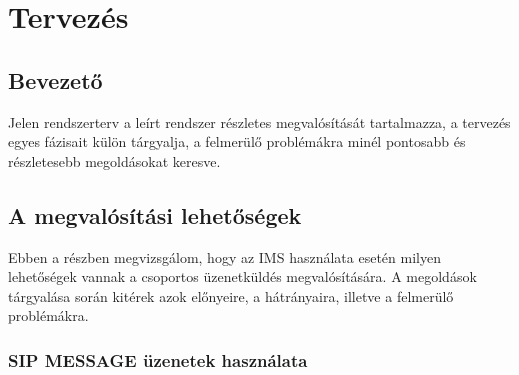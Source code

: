 

\section{Tervezés}

\subsection{Bevezető}

Jelen rendszerterv a leírt rendszer részletes megvalósítását
tartalmazza, a tervezés egyes fázisait külön tárgyalja, a felmerülő
problémákra minél pontosabb és részletesebb megoldásokat keresve.

\subsection{A megvalósítási lehetőségek}

Ebben a részben megvizsgálom, hogy az IMS használata esetén milyen lehetőségek vannak a csoportos üzenetküldés megvalósítására. A megoldások tárgyalása során kitérek azok előnyeire, a hátrányaira, illetve a felmerülő problémákra.

\subsubsection{SIP MESSAGE üzenetek használata}


